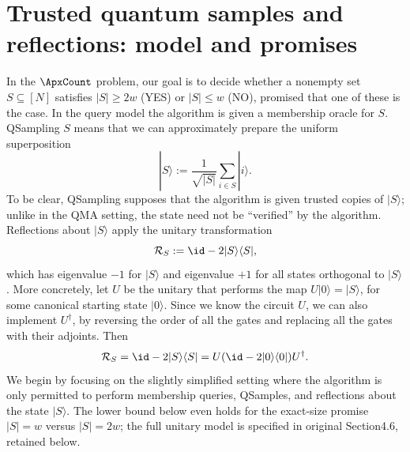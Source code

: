 \section*{Trusted quantum samples and reflections: model and promises}
In the $\ApxCount$ problem, our goal is to decide whether a nonempty set $S\subseteq[N]$ satisfies $|S|\ge2w$ (YES) or $|S|\le w$ (NO), promised that one of these is the case. In the query model the algorithm is given a membership oracle for $S$.
QSampling $S$ means that we can approximately prepare the uniform superposition
\[|S\rangle:=\frac1{\sqrt{|S|}}\sum_{i\in S}|i\rangle.\]
To be clear, QSampling supposes that the algorithm is given trusted copies of $|S\rangle$; unlike in the QMA setting, the state need not be ``verified'' by the algorithm.
Reflections about $|S\rangle$ apply the unitary transformation
\[\mathcal R_S:=\id-2|S\rangle\langle S|,\]
which has eigenvalue $-1$ for $|S\rangle$ and eigenvalue $+1$ for all states orthogonal to $|S\rangle$. More concretely, let $U$ be the unitary that performs the map $U|0\rangle=|S\rangle$, for some canonical starting state $|0\rangle$. Since we know the circuit $U$, we can also implement $U^\dagger$, by reversing the order of all the gates and replacing all the gates with their adjoints. Then
\[\mathcal R_S=\id-2|S\rangle\langle S|=U(\id-2|0\rangle\langle0|)U^\dagger.\]
We begin by focusing on the slightly simplified setting where the algorithm is only permitted to perform membership queries, QSamples, and reflections about the state $|S\rangle$. The lower bound below even holds for the exact-size promise $|S|=w$ versus $|S|=2w$; the full unitary model is specified in original Section4.6, retained below.
